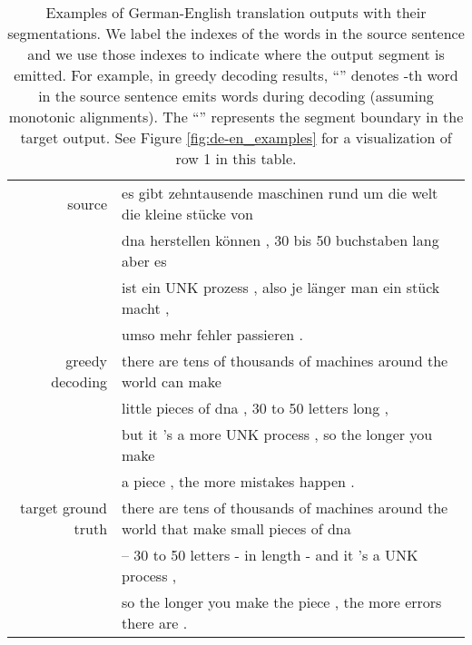 \documentclass{article}
\begin{document}
\begin{table*}[h!]
\begin{small}
{\begin{center}
\begin{tabular}{rl}
source & es gibt zehntausende maschinen rund um die welt die kleine st\"ucke von  \\ & dna herstellen k\"onnen ,  30 bis 50  buchstaben  lang aber  es \\ &ist ein UNK prozess , also je l\"anger man ein st\"uck macht ,\\ & umso mehr fehler passieren .							
					\\
					greedy decoding&   there are   tens of thousands of   machines   around   the world   can make  \\ & little  pieces  of  dna  ,    30  to  50  letters  long  ,  \\ &but  it 's  a more UNK  process  ,  so  the longer  you make  \\ &a piece  ,   the more  mistakes  happen  .    \\
					target ground truth & there are tens of thousands of machines around the world that make small pieces of dna \\ &-- 30 to 50 letters - in length - and it 's a UNK process , \\ &so the longer you make the piece , the more errors there are .								
					\\			
					\hline
				\end{tabular}
			\end{center}
		}
	\end{small}
	\vspace{-2mm}
	\caption{\small{Examples of German-English translation outputs with their
			segmentations. We label the indexes of the words in the source sentence and we
			use those indexes to indicate where the output segment is emitted. For
			example, in greedy decoding results, ``'' denotes -th word in the source sentence emits words
			 during decoding (assuming monotonic
			alignments).  The ``'' represents the segment boundary in the target
			output. See Figure \ref{fig:de-en_examples} for a visualization of row 1 in this table.}}
	\label{tab:de-en_examples}
\end{table*}
\end{document}
